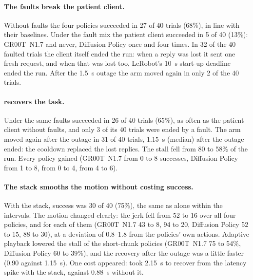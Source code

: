 \begin{table}[htbp]
  \centering
  \small
  \caption{E4 on cube in box v1: successful trials per policy and condition (in brackets: trials ended by a fault),
           and over all four policies with Wilson 95\% intervals. Bold: more successes than the patient client under the
           same faults (condition 2).}\label{tab:e4cube}
\end{table}


\paragraph{The faults break the patient client.} Without faults the four policies succeeded in 27 of 40 trials (68\%),
in line with their baselines. Under the fault mix the patient client succeeded in 5 of 40 (13\%): GR00T~N1.7 and
\smolvla{} never, Diffusion Policy once and \pizerofive{} four times. In 32 of the 40 faulted trials the client itself
ended the run: when a reply was lost it sent one fresh request, and when that was lost too, LeRobot's 10~s start-up
deadline ended the run. After the 1.5~s outage the arm moved again in only 2 of the 40 trials.

\paragraph{\drtc{} recovers the task.} Under the same faults \drtc{} succeeded in 26 of 40 trials (65\%), as often as
the patient client without faults, and only 3 of its 40 trials were ended by a fault. The arm moved again after the
outage in 31 of 40 trials, 1.15~s (median) after the outage ended: the cooldown replaced the lost replies. The stall
fell from 80 to 58\% of the run. Every policy gained (GR00T~N1.7 from 0 to 8 successes, Diffusion Policy from 1 to 8,
\smolvla{} from 0 to 4, \pizerofive{} from 4 to 6).

\paragraph{The stack smooths the motion without costing success.} With the stack, success was 30 of 40 (75\%), the
same as \drtc{} alone within the intervals. The motion changed clearly: the jerk fell from 52 to 16 over all four
policies, and for each of them (GR00T~N1.7 43 to 8, \smolvla{} 94 to 20, Diffusion Policy 52 to 15, \pizerofive{} 88 to
30), at a deviation of 0.8--1.8\degree{} from the policies' own actions. Adaptive playback lowered the stall of the
short-chunk policies (GR00T~N1.7 75 to 54\%, Diffusion Policy 60 to 39\%), and the recovery after the outage was a
little faster (0.90 against 1.15~s). One cost appeared: \pizerofive{} took 2.15~s to recover from the latency spike
with the stack, against 0.88~s without it.


